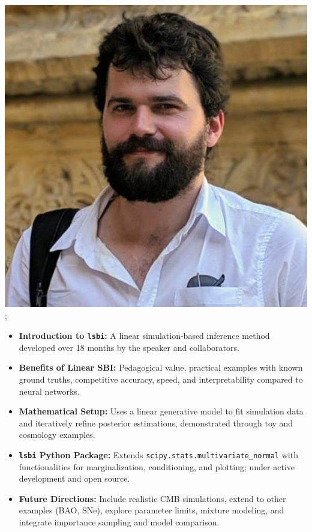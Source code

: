 \documentclass[aspectratio=169]{beamer}
\begin{document}
\begin{frame}
{        \includegraphics[width=0.10\textheight]{people/will_handley.jpg}%
    };
    \begin{itemize}
        \item \textbf{Introduction to \texttt{lsbi}:} A linear simulation-based inference method developed over 18 months by the speaker and collaborators.
        \item \textbf{Benefits of Linear SBI:} Pedagogical value, practical examples with known ground truths, competitive accuracy, speed, and interpretability compared to neural networks.
        \item \textbf{Mathematical Setup:} Uses a linear generative model to fit simulation data and iteratively refine posterior estimations, demonstrated through toy and cosmology examples.
        \item \textbf{\texttt{lsbi} Python Package:} Extends \texttt{scipy.stats.multivariate\_normal} with functionalities for marginalization, conditioning, and plotting; under active development and open source.
        \item \textbf{Future Directions:} Include realistic CMB simulations, extend to other examples (BAO, SNe), explore parameter limits, mixture modeling, and integrate importance sampling and model comparison.
    \end{itemize}
\end{frame}
\end{document}
